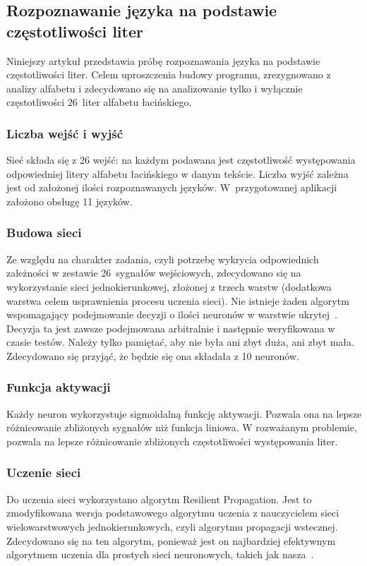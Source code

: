 \documentclass[journal]{IEEEtran}
\begin{document}
\subsection{Rozpoznawanie języka na podstawie częstotliwości liter}
Niniejszy artykuł przedstawia próbę rozpoznawania języka na podstawie częstotliwości liter. Celem uproszczenia budowy
programu, zrezygnowano z analizy alfabetu i zdecydowano się na analizowanie tylko i wyłącznie częstotliwości 26~liter
alfabetu łacińskiego.

\subsubsection{Liczba wejść i wyjść}
Sieć składa się z 26 wejść: na każdym podawana jest częstotliwość występowania odpowiedniej litery alfabetu łacińskiego
w danym tekście. Liczba wyjść zależna jest od założonej ilości rozpoznawanych języków. W~przygotowanej aplikacji założono
obsługę 11 języków.

\subsubsection{Budowa sieci}
Ze względu na charakter zadania, czyli potrzebę wykrycia odpowiednich zależności w zestawie 26~sygnałów wejściowych,
zdecydowano się na wykorzystanie sieci jednokierunkowej, złożonej z trzech warstw (dodatkowa warstwa celem usprawnienia
procesu uczenia sieci). Nie istnieje żaden algorytm wspomagający podejmowanie decyzji o ilości neuronów w warstwie
ukrytej~\cite{tad:elem_wpr}. Decyzja ta jest zawsze podejmowana arbitralnie i następnie weryfikowana w czasie testów.
Należy tylko pamiętać, aby nie była ani zbyt duża, ani zbyt mała. Zdecydowano się przyjąć, że będzie się ona składała
z 10 neuronów.

\subsubsection{Funkcja aktywacji}
Każdy neuron wykorzystuje sigmoidalną funkcję aktywacji. Pozwala ona na lepsze różnicowanie zbliżonych sygnałów niż funkcja
liniowa. W rozważanym problemie, pozwala na lepsze różnicowanie zbliżonych częstotliwości występowania liter.

\subsubsection{Uczenie sieci}
Do uczenia sieci wykorzystano algorytm Resilient Propagation. Jest to zmodyfikowana wersja podstawowego algorytmu uczenia
z nauczycielem sieci wielowarstwowych jednokierunkowych, czyli algorytmu propagacji wstecznej. Zdecydowano się na ten
algorytm, ponieważ jest on najbardziej efektywnym algorytmem uczenia dla prostych sieci neuronowych, takich jak nasza~\cite{encog:rprop}.
\end{document}
